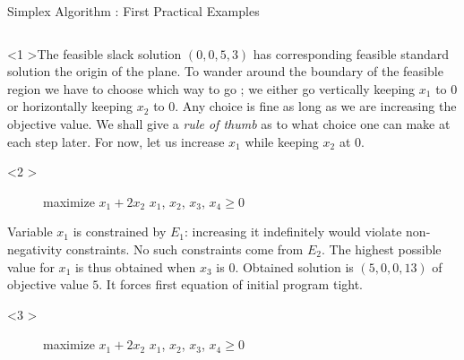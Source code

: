 \documentclass[aspectratio = 169]{beamer}
\begin{document}
\begin{frame}{Simplex Algorithm : First Practical Examples}
    \begin{columns}
        \begin{column}{.5\textwidth}
            \begin{onlyenv}<1
              >The feasible slack solution $(0, 0, 5, 3)$ has
              corresponding feasible standard solution the origin of
              the plane. To wander around the boundary of the feasible
              region we have to choose which way to go ; we either go
              vertically keeping $x_1$ to $0$ or horizontally keeping
              $x_2$ to $0$. Any choice is fine as long as we are
              increasing the objective value. We shall give a
              \textit{rule of thumb} as to what choice one can make at
              each step later. For now, let us increase $x_1$ while
              keeping $x_2$ at $0$.
            \end{onlyenv}
            \begin{onlyenv}<2
              >
              \begin{figure}
                \small{
                  \begin{linearProg}{
                      maximize
                    }{
                      $x_1 + 2x_2$
                    }{
                    }{
                      $x_1$, $x_2$, $x_3$, $x_4 \geq 0$  
                    }
                  \end{linearProg}
                }
              \end{figure}
              Variable $x_1$ is constrained by $E_1$: increasing it
              indefinitely would violate non-negativity
              constraints. No such constraints come from $E_2$. The
              highest possible value for $x_1$ is thus obtained when
              $x_3$ is $0$. Obtained solution is $(5, 0, 0, 13)$ of
              objective value $5$. It forces first equation of initial
              program tight.
            \end{onlyenv}
            \begin{onlyenv}<3
              >
              \begin{figure}
                \small{
                  \begin{linearProg}{
                      maximize
                    }{
                      $x_1 + 2x_2$
                    }{
                    }{
                      $x_1$, $x_2$, $x_3$, $x_4 \geq 0$  
                    }

\end{linearProg}}
\end{figure}
\end{onlyenv}
\end{column}
\end{columns}
\end{frame}
\end{document}
